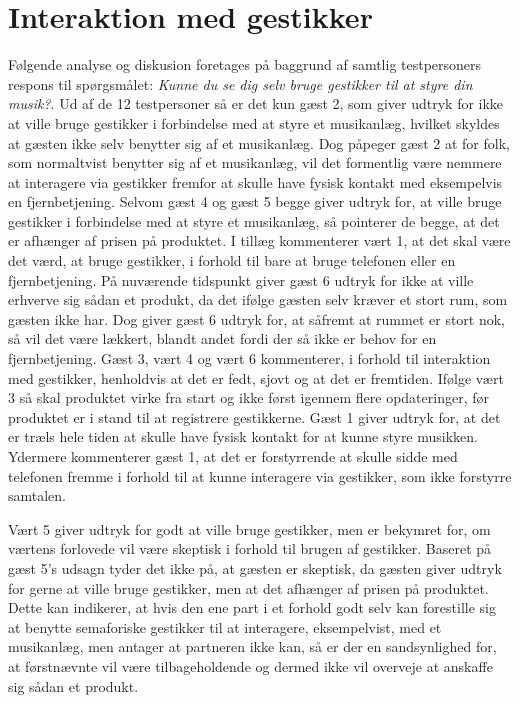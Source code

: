 \section{Interaktion med gestikker}
\label{TestresultaterSocialAcceptBrug}
%
Følgende analyse og diskusion foretages på baggrund af samtlig testpersoners respons til spørgsmålet: \textit{Kunne du se dig selv bruge gestikker til at styre din musik?}. \blankline
%
Ud af de 12 testpersoner så er det kun gæst 2, som giver udtryk for ikke at ville bruge gestikker i forbindelse med at styre et musikanlæg, hvilket skyldes at gæsten ikke selv benytter sig af et musikanlæg. Dog påpeger gæst 2 at for folk, som normaltvist benytter sig af et musikanlæg, vil det formentlig være nemmere at interagere via gestikker fremfor at skulle have fysisk kontakt med eksempelvis en fjernbetjening. Selvom gæst 4 og gæst 5 begge giver udtryk for, at ville bruge gestikker i forbindelse med at styre et musikanlæg, så pointerer de begge, at det er afhænger af prisen på produktet. I tillæg kommenterer vært 1, at det skal være det værd, at bruge gestikker, i forhold til bare at bruge telefonen eller en fjernbetjening. På nuværende tidspunkt giver gæst 6 udtryk for ikke at ville erhverve sig sådan et produkt, da det ifølge gæsten selv kræver et stort rum, som gæsten ikke har. Dog giver gæst 6 udtryk for, at såfremt at rummet er stort nok, så vil det være lækkert, blandt andet fordi der så ikke er behov for en fjernbetjening. Gæst 3, vært 4 og vært 6 kommenterer, i forhold til interaktion med gestikker, henholdvis at det er fedt, sjovt og at det er fremtiden. Ifølge vært 3 så skal produktet virke fra start og ikke først igennem flere opdateringer, før produktet er i stand til at registrere gestikkerne. Gæst 1 giver udtryk for, at det er træls hele tiden at skulle have fysisk kontakt for at kunne styre musikken. Ydermere kommenterer gæst 1, at det er forstyrrende at skulle sidde med telefonen fremme i forhold til at kunne interagere via gestikker, som ikke forstyrre samtalen.

Vært 5 giver udtryk for godt at ville bruge gestikker, men er bekymret for, om værtens forlovede vil være skeptisk i forhold til brugen af gestikker. Baseret på gæst 5's udsagn tyder det ikke på, at gæsten er skeptisk, da gæsten giver udtryk for gerne at ville bruge gestikker, men at det afhænger af prisen på produktet. Dette kan indikerer, at hvis den ene part i et forhold godt selv kan forestille sig at benytte semaforiske gestikker til at interagere, eksempelvist, med et musikanlæg, men antager at partneren ikke kan, så er der en sandsynlighed for, at førstnævnte vil være tilbageholdende og dermed ikke vil overveje at anskaffe sig sådan et produkt.    

